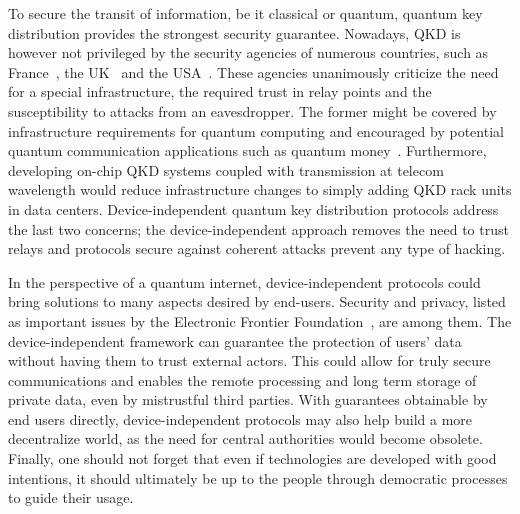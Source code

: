 To secure the transit of information, be it classical or quantum, quantum key distribution provides the strongest security guarantee.
Nowadays, QKD is however not privileged by the security agencies of numerous countries, such as France~\cite{ANSSI2020}, the UK~\cite{NCSC2020} and the USA~\cite{NSA2020}.
These agencies unanimously criticize the need for a special infrastructure, the required trust in relay points and the susceptibility to attacks from an eavesdropper.
The former might be covered by infrastructure requirements for quantum computing and encouraged by potential quantum communication applications such as quantum money~\cite{Wiesner1983,Molina2013}.
Furthermore, developing on-chip QKD systems coupled with transmission at telecom wavelength would reduce infrastructure changes to simply adding QKD rack units in data centers. 
Device-independent quantum key distribution protocols address the last two concerns; the device-independent approach removes the need to trust relays and protocols secure against coherent attacks prevent any type of hacking.

\medbreak

In the perspective of a quantum internet, device-independent protocols could bring solutions to many aspects desired by end-users.
Security and privacy, listed as important issues by the Electronic Frontier Foundation~\cite{EFFPrivacy,EFFSecurity}, are among them.
The device-independent framework can guarantee the protection of users' data without having them to trust external actors.
This could allow for truly secure communications and enables the remote processing and long term storage of private data, even by mistrustful third parties.
With guarantees obtainable by end users directly, device-independent protocols may also help build a more decentralize world, as the need for central authorities would become obsolete.
Finally, one should not forget that even if technologies are developed with good intentions, it should ultimately be up to the people through democratic processes to guide their usage.
